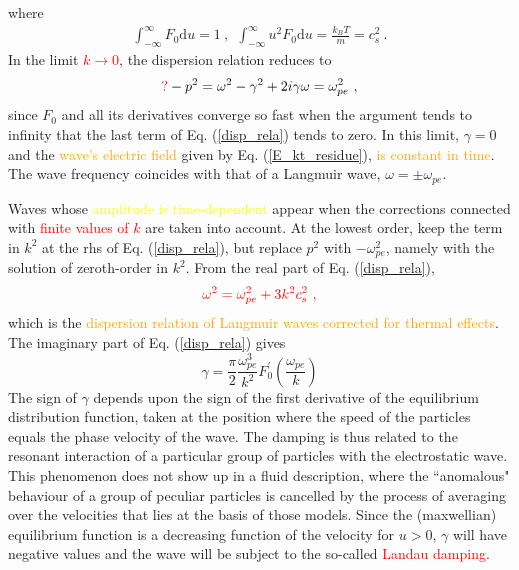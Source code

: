 \documentclass[12pt,a4paper]{article}
\newcommand{\dif}{\mathrm{d}}
\begin{document}
where
\begin{align*}
\int_{-\infty}^\infty F_0 \dif u = 1 ~, ~~ \int_{-\infty}^\infty u^2 F_0 \dif u = \frac{k_B T}{m} = c_s^2 ~.
\end{align*}
In the limit \textcolor{red}{$k \rightarrow 0$}, the dispersion relation reduces to
\begin{equation*}
\textcolor{red}{?} -p^2 = \omega^2 -\gamma^2 +2i\gamma \omega = \omega^2_{pe} ~,
\end{equation*}
since $F_0$ and all its derivatives converge so fast when the argument tends to infinity that the last term of Eq. (\ref{disp_rela}) tends to zero. In this limit, $\gamma =0$ and the \textcolor{orange}{wave's electric field} given by Eq. (\ref{E_kt_residue}), \textcolor{orange}{is constant in time}. The wave frequency coincides with that of a Langmuir wave, $\omega = \pm \omega_{pe}$.

Waves whose \textcolor{yellow}{amplitude is time-dependent} appear when the corrections connected with \textcolor{red}{finite values of $k$} are taken into account. At the lowest order, keep the term in $k^2$ at the rhs of Eq. (\ref{disp_rela}), but replace $p^2$ with $-\omega^2_{pe}$, namely with the solution of zeroth-order in $k^2$. From the real part of Eq. (\ref{disp_rela}),
\begin{equation}
\color{red} \omega^2 = \omega^2_{pe} +3k^2 c_s^2 ~, 
\end{equation}
which is the \textcolor{orange}{dispersion relation of Langmuir waves corrected for thermal effects}. The imaginary part of Eq. (\ref{disp_rela}) gives 
\begin{equation}
\gamma = \frac{\pi}{2} \frac{\omega_{pe}^3}{k^2} F^\prime_0\left(\dfrac{\omega_{pe}}{k} \right)
\end{equation}
The sign of $\gamma$ depends upon the sign of the first derivative of the equilibrium distribution function, taken at the position where the speed of the particles equals the phase velocity of the wave. The damping is thus related to the resonant interaction of a particular group of particles with the electrostatic wave. This phenomenon does not show up in a fluid description, where the ``anomalous" behaviour of a group of peculiar particles is cancelled by the process of averaging over the velocities that lies at the basis of those models. Since the (maxwellian) equilibrium function is a decreasing function of the velocity for $u > 0$, $\gamma$ will have negative values and the wave will be subject to the so-called \textcolor{red}{Landau damping}.
\end{document}
